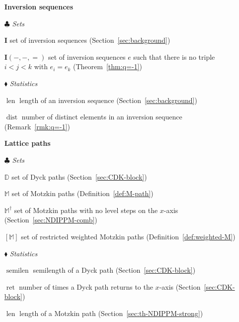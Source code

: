 \documentclass[12pt,reqno]{amsart}
\numberwithin{equation}{section}
\theoremstyle{theorem}
\theoremstyle{definition}
\theoremstyle{named}
\newcommand{\dist}{\operatorname{dist}}
\newcommand{\bI}{\mathbf{I}}
\newcommand{\len}{\operatorname{len}}
\newcommand{\semilen}{\operatorname{semilen}}
\newcommand{\touch}{\operatorname{ret}}
\newcommand{\bbM}{\mathbb{M}}
\newcommand{\bbD}{\mathbb{D}}
\begin{document}
\begin{itemize}[
	itemindent=0pt, 
	leftmargin=2.75cm, 
	topsep=6pt, 
	itemsep=2pt,
	labelsep=0pt, 
	labelwidth=2.75cm,
	align=left
	]
	\item[\textbf{\textsf{Inversion sequences}}]
	
	\item[$\clubsuit$ \textit{Sets}]
	
	\item[$\bI$] set of inversion sequences (Section~\ref{sec:background})
	
	\item[$\bI(-,-,=)$] set of inversion sequences $e$ such that there is no triple $i < j < k$ with $e_i = e_k$ (Theorem~\ref{thm:q=-1})
	
	\item[$\blacklozenge$ \textit{Statistics}]
	
	\item[$\len$] length of an inversion sequence (Section~\ref{sec:background})
	
	\item[$\dist$] number of distinct elements in an inversion sequence (Remark~\ref{rmk:q=-1})
	
	\item[\textbf{\textsf{Lattice paths}}]
	
	\item[$\clubsuit$ \textit{Sets}]
	
	\item[$\bbD$] set of Dyck paths (Section~\ref{sec:CDK-block})
	
	\item[$\bbM$] set of Motzkin paths (Definition~\ref{def:M-path})
	
	\item[$\bbM^\dagger$] set of Motzkin paths with no level steps on the $x$-axis (Section~\ref{sec:NDIPPM-comb})
	
	\item[{$[\bbM]$}] set of restricted weighted Motzkin paths (Definition~\ref{def:weighted-M})
	
	\item[$\blacklozenge$ \textit{Statistics}]
	
	\item[$\semilen$] semilength of a Dyck path (Section~\ref{sec:CDK-block})
	
	\item[$\touch$] number of times a Dyck path returns to the $x$-axis (Section~\ref{sec:CDK-block})
	
	\item[$\len$] length of a Motzkin path (Section~\ref{sec:th-NDIPPM-strong})
	

\end{itemize}
\end{document}
